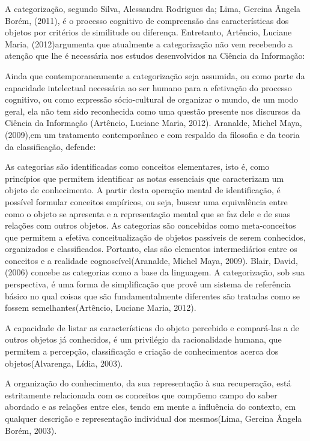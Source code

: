 A categorização, segundo Silva, Alessandra Rodrigues da; Lima, Gercina Ângela Borém, (2011), é o processo cognitivo de compreensão das características dos objetos por critérios de similitude ou diferença. Entretanto, Artêncio, Luciane Maria, (2012)argumenta que atualmente a categorização não vem recebendo a atenção que lhe é necessária nos estudos desenvolvidos na Ciência da Informação:

Ainda que contemporaneamente a categorização seja assumida, ou como parte da capacidade intelectual necessária ao ser humano para a efetivação do processo cognitivo, ou como expressão sócio-cultural de organizar o mundo, de um modo geral, ela não tem sido reconhecida como uma questão presente nos discursos da Ciência da Informação (Artêncio, Luciane Maria, 2012).
Aranalde, Michel Maya, (2009),em um tratamento contemporâneo e com respaldo da filosofia e da teoria da classificação, defende:

As categorias são identificadas como conceitos elementares, isto é, como princípios que permitem identificar as notas essenciais que caracterizam um objeto de conhecimento. A partir desta operação mental de identificação, é possível formular conceitos empíricos, ou seja, buscar uma equivalência entre como o objeto se apresenta e a representação mental que se faz dele e de suas relações com outros objetos. As categorias são concebidas como meta-conceitos que permitem a efetiva conceitualização de objetos passíveis de serem conhecidos, organizados e classificados. Portanto, elas são elementos intermediários entre os conceitos e a realidade cognoscível(Aranalde, Michel Maya, 2009).
Blair, David, (2006) concebe as categorias como a base da linguagem. A categorização, sob sua perspectiva, é uma forma de simplificação que provê um sistema de referência básico no qual coisas que são fundamentalmente diferentes são tratadas como se fossem semelhantes(Artêncio, Luciane Maria, 2012).

A capacidade de listar as características do objeto percebido e compará-las a de outros objetos já conhecidos, é um privilégio da racionalidade humana, que permitem a percepção, classificação e criação de conhecimentos acerca dos objetos(Alvarenga, Lídia, 2003).

A organização do conhecimento, da sua representação à sua recuperação, está estritamente relacionada com os conceitos que compõemo campo do saber abordado e as relações entre eles, tendo em mente a influência do contexto, em qualquer descrição e representação individual dos mesmos(Lima, Gercina Ângela Borém, 2003).

